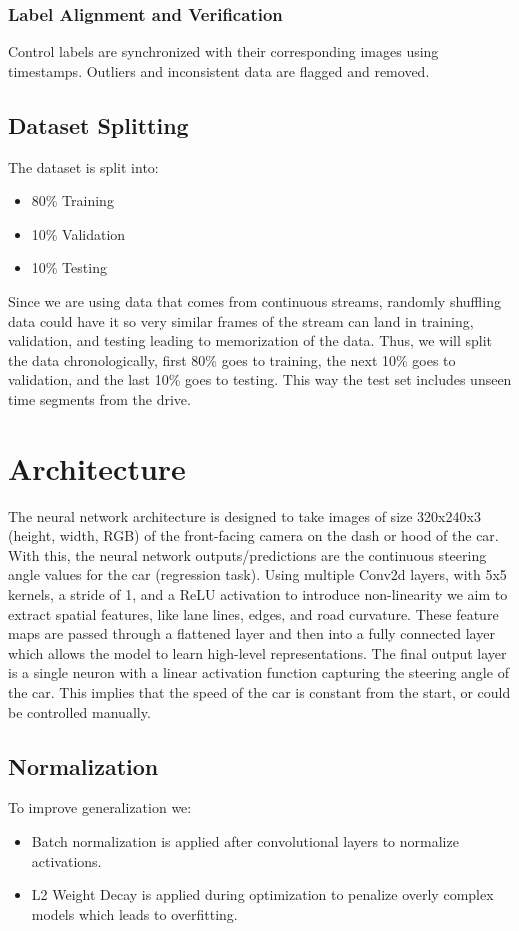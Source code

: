 \documentclass{article} %
\begin{document}
\subsubsection{Label Alignment and Verification}
Control labels are synchronized with their corresponding images using timestamps. Outliers and inconsistent 
data are flagged and removed. 

\subsection{Dataset Splitting}
The dataset is split into:
\begin{itemize}
  \item 80\% Training
  \item 10\% Validation 
  \item 10\% Testing 
\end{itemize}

Since we are using data that comes from continuous streams, randomly shuffling data could have
it so very similar frames of the stream can land in training, validation, and testing leading to 
memorization of the data. Thus, we will split the data chronologically, first 80\% goes to 
training, the next 10\% goes to validation, and the last 10\% goes to testing. This way the test set 
includes unseen time segments from the drive. 


\section{Architecture}

The neural network architecture is designed to take images of size 320x240x3 (height, width, RGB) of the
front-facing camera on the dash or hood of the car. With this, the neural network outputs/predictions are the 
continuous steering angle values for the car (regression task). Using multiple Conv2d layers, with 5x5 kernels, 
a stride of 1, and a ReLU activation to introduce non-linearity we aim to extract spatial features, like 
lane lines, edges, and road curvature. These feature maps are passed through a flattened layer and then into 
a fully connected layer which allows the model to learn high-level representations. The final output layer is a single neuron
with a linear activation function capturing the steering angle of the car. This implies that the speed of the car
is constant from the start, or could be controlled manually.

\subsection{Normalization}
To improve generalization we:
\begin{itemize}
  \item Batch normalization is applied after convolutional layers to normalize activations.
  \item L2 Weight Decay is applied during optimization to penalize overly complex models which leads to overfitting.
\end{itemize}
\end{document}
